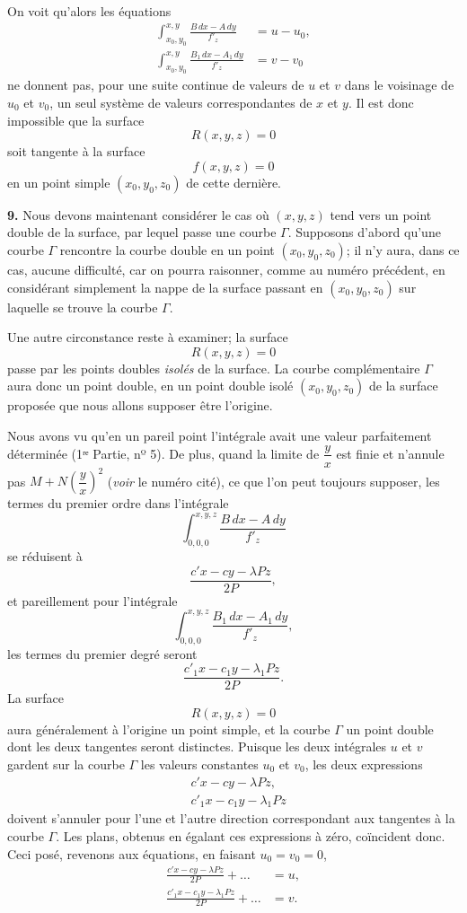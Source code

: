 \documentclass{article}
\begin{document}
On voit qu'alors les équations
\[
\begin{aligned}
\int_{x_{0}, y_{0}}^{x, y} \frac{B\,dx - A\,dy}{f'_{z}} &= u - u_{0}, \\
\int_{x_{0}, y_{0}}^{x, y} \frac{B_{1}\,dx - A_{1}\,dy}{f'_{z}} &= v - v_{0}
\end{aligned}
\]
ne donnent pas, pour une suite continue de valeurs de $u$ et $v$ dans le voisinage de $u_{0}$ et $v_{0}$, un seul système de valeurs correspondantes de $x$ et $y$. Il est donc impossible que la surface
\[
R(x, y, z) = 0
\]
soit tangente à la surface
\[
f(x, y, z) = 0
\]
en un point simple $(x_{0}, y_{0}, z_{0})$ de cette dernière.

\textbf{9.} Nous devons maintenant considérer le cas où $(x, y, z)$ tend vers un point double de la surface, par lequel passe une courbe $\Gamma$. Supposons d'abord qu'une courbe $\Gamma$ rencontre la courbe double en un point $(x_{0}, y_{0}, z_{0})$; il n'y aura, dans ce cas, aucune difficulté, car on pourra raisonner, comme au numéro précédent, en considérant simplement la nappe de la surface passant en $(x_{0}, y_{0}, z_{0})$ sur laquelle se trouve la courbe $\Gamma$.

Une autre circonstance reste à examiner; la surface
\[
R(x, y, z) = 0
\]
passe par les points doubles \emph{isolés} de la surface. La courbe complémentaire
$\Gamma$ aura donc un point double, en un point double isolé $(x_{0}, y_{0}, z_{0})$ de la surface proposée que nous allons supposer être l'origine.

Nous avons vu qu'en un pareil point l'intégrale avait une valeur parfaitement déterminée (1ʳᵉ Partie, nº 5). De plus, quand la limite de $\dfrac{y}{x}$ est finie et n'annule pas $M + N\left( \dfrac{y}{x} \right)^{2}$ (\emph{voir} le numéro cité), ce que l'on peut toujours supposer, les termes du premier ordre dans l'intégrale
\[
\int_{0, 0, 0}^{x, y, z} \frac{B\,dx - A\,dy}{f'_{z}}
\]
se réduisent à
\[
\frac{c'x - cy - \lambda Pz}{2P},
\]
et pareillement pour l'intégrale
\[
\int_{0, 0, 0}^{x, y, z} \frac{B_{1}\,dx - A_{1}\,dy}{f'_{z}},
\]
les termes du premier degré seront
\[
\frac{c'_{1}x - c_{1}y - \lambda_{1}Pz}{2P}.
\]
La surface
\[
R(x, y, z) = 0
\]
aura généralement à l'origine un point simple, et la courbe $\Gamma$ un point double dont les deux tangentes seront distinctes. Puisque les deux intégrales $u$ et $v$ gardent sur la courbe $\Gamma$ les valeurs constantes $u_{0}$ et $v_{0}$, les deux expressions
\[
\begin{aligned}
&c'x - cy - \lambda Pz, \\
&c'_{1}x - c_{1}y - \lambda_{1}Pz
\end{aligned}
\]
doivent s'annuler pour l'une et l'autre direction correspondant aux tangentes à la courbe $\Gamma$. Les plans, obtenus en égalant ces expressions à
zéro, coïncident donc. Ceci posé, revenons aux équations, en faisant $u_{0} = v_{0} = 0$,
\[
\begin{aligned}
\frac{c'x - cy - \lambda Pz}{2P} + \ldots &= u, \\
\frac{c'_{1}x - c_{1}y - \lambda_{1}Pz}{2P} + \ldots &= v.
\end{aligned}
\]
\end{document}
